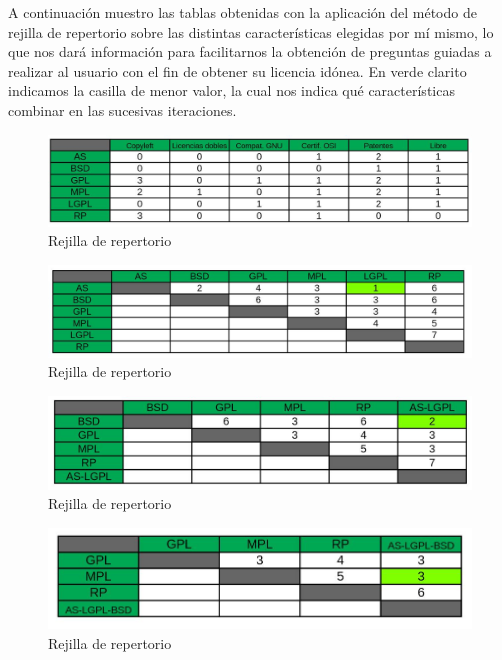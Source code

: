 A continuación muestro las tablas obtenidas con la aplicación del método de rejilla de repertorio sobre las distintas características elegidas por mí mismo, lo que nos dará información para facilitarnos la obtención de preguntas guiadas a realizar al usuario con el fin de obtener su licencia idónea. En verde clarito indicamos la casilla de menor valor, la cual nos indica qué características combinar en las sucesivas iteraciones.

\begin{figure}[H] %
	\centering
	\includegraphics[scale=0.48]{1} 
	\caption{Rejilla de repertorio} \label{etiq}
\end{figure}

\begin{figure}[H] %
	\centering
	\includegraphics[scale=0.48]{2} 
	\caption{Rejilla de repertorio} \label{etiq}
\end{figure}

\begin{figure}[H] %
	\centering
	\includegraphics[scale=0.48]{3} 
	\caption{Rejilla de repertorio} \label{etiq}
\end{figure}

\begin{figure}[H] %
	\centering
	\includegraphics[scale=0.48]{4} 
	\caption{Rejilla de repertorio} \label{etiq}
\end{figure}

